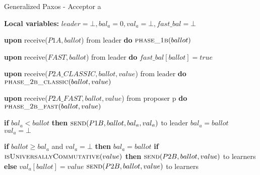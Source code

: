 \begin{algorithm} 
	\caption{Generalized Paxos - Acceptor a}
	\label{CFT-Acc}
	\textbf{Local variables:} $leader = \bot, bal_a = 0,val_a = \bot,fast\_bal = \bot$
	\begin{algorithmic}[1]
		\State \textbf{upon} receive($P1A, ballot$) from leader \textbf{do}
		\State \hspace{\algorithmicindent} $\Call{phase\_1b}{ballot}$
		
		\State
		\State \textbf{upon} receive($FAST,ballot$) from leader \textbf{do}
		\State \hspace{\algorithmicindent} $fast\_bal[ballot] = true$
		
		\State
		\State \textbf{upon} receive($P2A\_CLASSIC, ballot, value$) from leader \textbf{do}
		\State \hspace{\algorithmicindent} $\Call{phase\_2b\_classic}{ballot, value}$
		
		\State		
		\State \textbf{upon} receive($P2A\_FAST,ballot,value$) from proposer p \textbf{do}
		\State \hspace{\algorithmicindent} $\Call{phase\_2b\_fast}{ballot, value}$
		
		\State
		\State \textbf{if} $bal_a < ballot$ \textbf{then}
		\State \hspace{\algorithmicindent} $\Call{send}{P1B, ballot, bal_a, val_a}$ to leader
		\State \hspace{\algorithmicindent} $bal_a = ballot$
		\State \hspace{\algorithmicindent} $val_a = \bot$

		\EndFunction
		
		\State
		\State \textbf{if} $ballot \geq bal_a$ and $val_a = \bot$ \textbf{then}
		\State \hspace{\algorithmicindent} $bal_a = ballot$
		\State \hspace{\algorithmicindent} \textbf{if} $\Call{isUniversallyCommutative}{value}$ \textbf{then}
		\State \hspace{\algorithmicindent}\hspace{\algorithmicindent} $\Call{send}{P2B, ballot, value}$ to learners
		\State \hspace{\algorithmicindent}\textbf{else}
		\State \hspace{\algorithmicindent}\hspace{\algorithmicindent} $val_a[ballot] = value$
		\State \hspace{\algorithmicindent}\hspace{\algorithmicindent} $\Call{send}{P2B, ballot, value}$ to learners
		\EndFunction
		

\end{algorithmic}
\end{algorithm}

